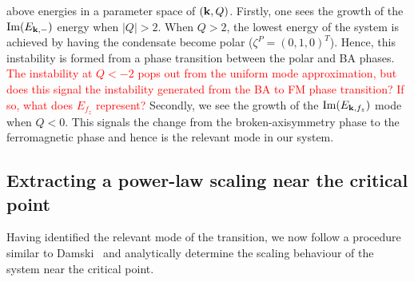 above energies in a parameter space of \( (\vb{k}, Q) \).
Firstly, one sees the growth of the \( \mathrm{Im}(E_{\vb{k}, -}) \) energy
when \( |Q| > 2 \).
When \( Q>2 \), the lowest energy of the system is achieved by having the
condensate become polar (\( \zeta^P={(0,1,0)}^T \)).
Hence, this instability is formed from a phase transition between the polar
and BA phases.
\textcolor{red}{The instability at \( Q < -2 \) pops out from the uniform mode
approximation, but does this signal the instability generated from the BA
to FM phase transition? If so, what does \( E_{f_{z}} \) represent?}
Secondly, we see the growth of the \( \mathrm{Im}(E_{\vb{k}, {f_z}}) \) mode
when \( Q<0 \).
This signals the change from the broken-axisymmetry phase to the ferromagnetic
phase and hence is the relevant mode in our system.

\subsection{Extracting a power-law scaling near the critical point}
Having identified the relevant mode of the transition, we now follow a procedure
similar to Damski~\cite{Damski2007} and analytically determine the scaling
behaviour of the system near the critical point.

